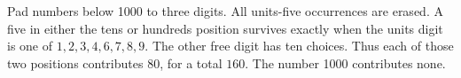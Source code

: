 Pad numbers below 1000 to three digits. All units-five occurrences are erased. A five in either the tens or hundreds position survives exactly when the units digit is one of $1,2,3,4,6,7,8,9$. The other free digit has ten choices. Thus each of those two positions contributes 80, for a total $\boxed{160}$. The number 1000 contributes none.

